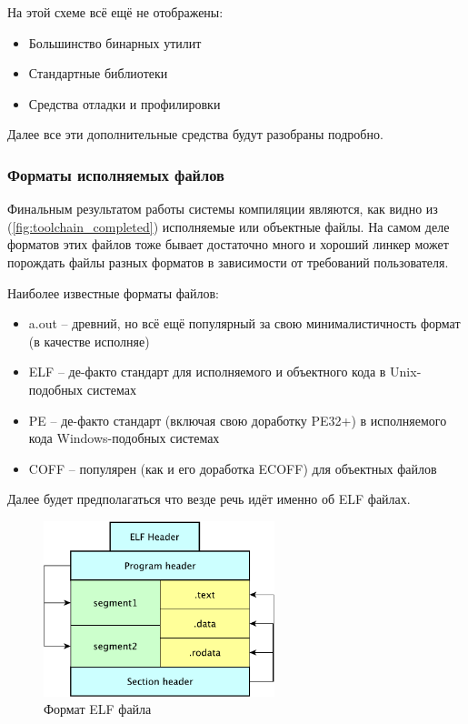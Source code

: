 \documentclass[a4paper,12pt,oneside]{article}
\begin{document}
На этой схеме всё ещё не отображены:

\begin{itemize}
\item Большинство бинарных утилит
\item Стандартные библиотеки
\item Средства отладки и профилировки
\end{itemize}

Далее все эти дополнительные средства будут разобраны подробно.

\subsubsection{Форматы исполняемых файлов}\label{subsubsec:ELF}

Финальным результатом работы системы компиляции являются, как видно из (\ref{fig:toolchain_completed}) исполняемые или объектные файлы. На самом деле форматов этих файлов тоже бывает достаточно много и хороший линкер может порождать файлы разных форматов в зависимости от требований пользователя.

Наиболее известные форматы файлов:

\begin{itemize}
\item a.out -- древний, но всё ещё популярный за свою минималистичность формат (в качестве исполняе)
\item ELF -- де-факто стандарт для исполняемого и объектного кода в Unix-подобных системах
\item PE -- де-факто стандарт (включая свою доработку PE32+) в исполняемого кода Windows-подобных системах
\item COFF -- популярен (как и его доработка ECOFF) для объектных файлов
\end{itemize}

Далее будет предполагаться что везде речь идёт именно об ELF файлах.

\begin{figure}[ht]
\centering
\includegraphics[width=0.6\textwidth]{illustrations/elf-structure-crop.pdf}
\caption{Формат ELF файла}
\label{fig:elf}
\end{figure}
\end{document}
